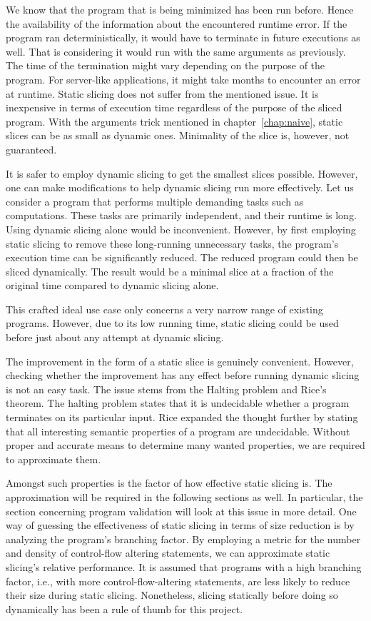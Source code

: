 We know that the program that is being minimized has been run before.
Hence the availability of the information about the encountered runtime 
error.
If the program ran deterministically, it would have to terminate in future 
executions as well.
That is considering it would run with the same arguments as previously.
The time of the termination might vary depending on the purpose of 
the program.
For server-like applications, it might take months to encounter an error 
at runtime.
Static slicing does not suffer from the mentioned issue.
It is inexpensive in terms of execution time regardless of the purpose 
of the sliced program.
With the arguments trick mentioned in chapter~\ref{chap:naive}, 
static slices can be as small as dynamic ones.
Minimality of the slice is, however, not guaranteed.

It is safer to employ dynamic slicing to get the smallest slices possible.
However, one can make modifications to help dynamic slicing run more 
effectively.
Let us consider a program that performs multiple demanding tasks 
such as computations.
These tasks are primarily independent, and their runtime is long.
Using dynamic slicing alone would be inconvenient.
However, by first employing static slicing to remove these long-running 
unnecessary tasks, the program's execution time can be significantly reduced.
The reduced program could then be sliced dynamically.
The result would be a minimal slice at a fraction of the original time 
compared to dynamic slicing alone.

This crafted ideal use case only concerns a very narrow range of existing 
programs.
However, due to its low running time, static slicing could be used before 
just about any attempt at dynamic slicing.


The improvement in the form of a static slice is genuinely convenient.
However, checking whether the improvement has any effect before running 
dynamic slicing is not an easy task.
The issue stems from the Halting problem and Rice's theorem.
The halting problem states that it is undecidable whether a program 
terminates on its particular input.
Rice expanded the thought further by stating that all interesting semantic 
properties of a program are undecidable.
Without proper and accurate means to determine many wanted properties, 
we are required to approximate them.

Amongst such properties is the factor of how effective static slicing is.
The approximation will be required in the following sections as well.
In particular, the section concerning program validation will look at this 
issue in more detail.
One way of guessing the effectiveness of static slicing in terms of size 
reduction is by analyzing the program's branching factor.
By employing a metric for the number and density of control-flow altering 
statements, we can approximate static slicing's relative performance.
It is assumed that programs with a high branching factor, i.e., with more 
control-flow-altering statements, are less likely to reduce their size 
during static slicing.
Nonetheless, slicing statically before doing so dynamically has been 
a rule of thumb for this project.

